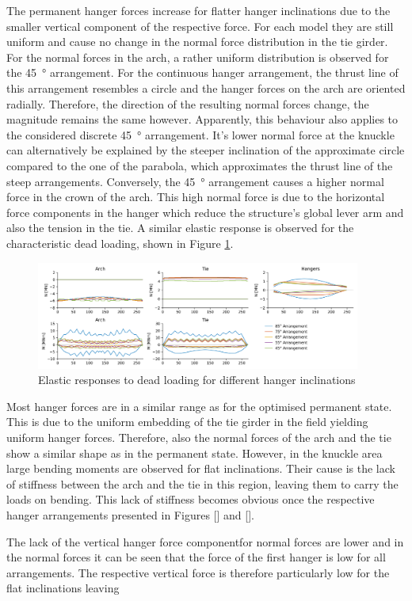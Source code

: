 The permanent hanger forces increase for flatter hanger inclinations due to the smaller vertical component of the respective force. For each model they are still uniform and cause no change in the normal force distribution in the tie girder. For the normal forces in the arch, a rather uniform distribution is observed for the \SI{45}{\degree} arrangement. For the continuous hanger arrangement, the thrust line of this arrangement resembles a circle and the hanger forces on the arch are oriented radially. Therefore, the direction of the resulting normal forces change, the magnitude remains the same however. Apparently, this behaviour also applies to the considered discrete \SI{45}{\degree} arrangement. It's lower normal force at the knuckle can alternatively be explained by the steeper inclination of the approximate circle compared to the one of the parabola, which approximates the thrust line of the steep arrangements. Conversely, the \SI{45}{\degree} arrangement causes a higher normal force in the crown of the arch. This high normal force is due to the horizontal force components in the hanger which reduce the structure's global lever arm and also the tension in the tie. 
A similar elastic response is observed for the characteristic dead loading, shown in Figure \ref{fig:inclination_dead}.
\begin{figure}[H]
    \centering
    \includegraphics[width=0.95\textwidth]{calculations/parallel arrangement comparison/live loading.png}
    \caption{Elastic responses to dead loading for different hanger inclinations}
    \label{fig:inclination_dead}
\end{figure}

Most hanger forces are in a similar range as for the optimised permanent state. This is due to the uniform embedding of the tie girder in the field yielding uniform hanger forces. Therefore, also the normal forces of the arch and the tie show a similar shape as in the permanent state. However, in the knuckle area large bending moments are observed for flat inclinations. Their cause is the lack of stiffness between the arch and the tie in this region, leaving them to carry the loads on bending. This lack of stiffness becomes obvious once the respective hanger arrangements presented in Figures [] and [].

The lack of the vertical hanger force componentfor normal forces are lower and  in the normal forces it can be seen that the force of the first hanger is low for all arrangements. The respective vertical force is therefore particularly low for the flat inclinations leaving













